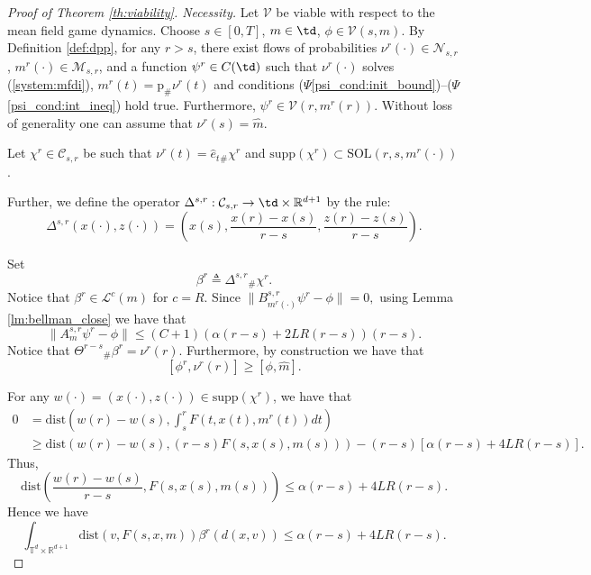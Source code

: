 \documentclass[a4paper,12pt]{article}
\newcommand{\rdp}{\mathbb{R}^{d+1}}
\newcommand{\intTdRdp}{\int_{\mathbb{T}^d\times \mathbb{R}^{d+1}}}
\begin{document}
\begin{proof}[Proof of Theorem \ref{th:viability}. Necessity]
	Let $\mathcal{V}$ be viable with respect to the mean field game dynamics. Choose $s\in [0,T]$, $m\in \td$, $\phi\in\mathcal{V}(s,m)$. By Definition \ref{def:dpp}, for any $r>s$, there exist  flows of probabilities $\nu^r(\cdot)\in\mathcal{N}_{s,r}$, $m^r(\cdot)\in\mathcal{M}_{s,r}$,  and a function $\psi^r\in C(\td)$ such that $\nu^r(\cdot)$ solves (\ref{system:mfdi}), $m^r(t)=\mathrm{p}_\#\nu^r(t)$ and conditions ($\Psi$\ref{psi_cond:init_bound})--($\Psi$\ref{psi_cond:int_ineq}) hold true. Furthermore, $\psi^r\in \mathcal{V}(r,m^r(r))$. Without loss of generality one can assume that $\nu^r(s)=\widehat{m}$. 
	
	Let $\chi^r\in\mathcal{C}_{s,r}$ be such that $\nu^r(t)=\hat{e}_t{}_\#\chi^r$ and $\mathrm{supp}(\chi^r)\subset\mathrm{SOL}(r,s,m^r(\cdot))$. 
	
	Further, we define the operator $\Delta^{s,r}:\mathcal{C}_{s,r}\rightarrow \td\times\rdp$ by the rule:
	\begin{equation}\label{intro:Delta}
	\Delta^{s,r}(x(\cdot),z(\cdot))=\left(x(s),\frac{x(r)-x(s)}{r-s},\frac{z(r)-z(s)}{r-s}\right). 
	\end{equation}
	
	Set
	$$\beta^r\triangleq \Delta^{s,r}{}_\#\chi^r. $$ 
	Notice that $\beta^r\in\mathcal{L}^c(m)$ for $c=R$. 
	Since $\|B_{m^r(\cdot)}^{s,r}\psi^r-\phi\|=0,$ using Lemma \ref{lm:bellman_close} we have that
	\begin{equation}\label{A_m_r}
	\|A_{m}^{s,r}\psi^r-\phi\|\leq (C+1)(\alpha(r-s)+2LR(r-s))(r-s).
	\end{equation} Notice that  $\Theta^{r-s}{}_\#\beta^r=\nu^r(r)$. Furthermore, by construction we have that
	\begin{equation}\label{ineq:beta_r_psi}
	[\phi^r,\nu^r(r)]\geq [\phi,\widehat{m}].
	\end{equation}
	
	For any $w(\cdot)=(x(\cdot),z(\cdot))\in \mathrm{supp}(\chi^r)$, we have that
	\begin{equation*}
	\begin{split}
	0&=\mathrm{dist}\left(w(r)-w(s),\int_s^rF(t,x(t),m^r(t))dt\right)\\&\geq \mathrm{dist}\left(w(r)-w(s),(r-s)F(s,x(s),m(s))\right)-(r-s)[\alpha(r-s)+4LR(r-s)].
	\end{split}
	\end{equation*} Thus,
	$$\mathrm{dist}\left(\frac{w(r)-w(s)}{r-s},F(s,x(s),m(s))\right)\leq \alpha(r-s)+4LR(r-s). $$
	Hence we have
	\begin{equation}\label{ineq:F_beta_r}
	\intTdRdp \mathrm{dist}\left(v,F(s,x,m)\right)\beta^r(d(x,v))\leq \alpha(r-s)+4LR(r-s).
	\end{equation}
	

\end{proof}
\end{document}

